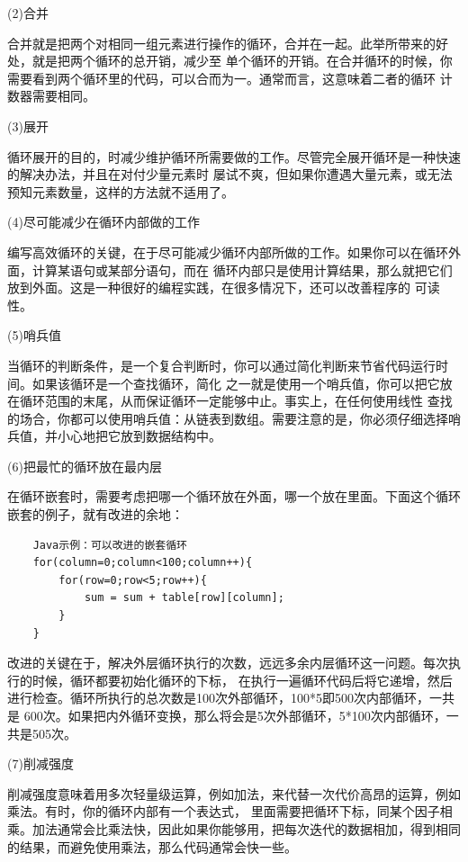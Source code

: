\documentclass{article}
\begin{document}
\par
(2)合并
\par
合并就是把两个对相同一组元素进行操作的循环，合并在一起。此举所带来的好处，就是把两个循环的总开销，减少至
单个循环的开销。在合并循环的时候，你需要看到两个循环里的代码，可以合而为一。通常而言，这意味着二者的循环
计数器需要相同。

\par
(3)展开
\par
循环展开的目的，时减少维护循环所需要做的工作。尽管完全展开循环是一种快速的解决办法，并且在对付少量元素时
屡试不爽，但如果你遭遇大量元素，或无法预知元素数量，这样的方法就不适用了。

\par
(4)尽可能减少在循环内部做的工作
\par
编写高效循环的关键，在于尽可能减少循环内部所做的工作。如果你可以在循环外面，计算某语句或某部分语句，而在
循环内部只是使用计算结果，那么就把它们放到外面。这是一种很好的编程实践，在很多情况下，还可以改善程序的
可读性。

\par
(5)哨兵值
\par
当循环的判断条件，是一个复合判断时，你可以通过简化判断来节省代码运行时间。如果该循环是一个查找循环，简化
之一就是使用一个哨兵值，你可以把它放在循环范围的末尾，从而保证循环一定能够中止。事实上，在任何使用线性
查找的场合，你都可以使用哨兵值：从链表到数组。需要注意的是，你必须仔细选择哨兵值，并小心地把它放到数据结构中。

\par
(6)把最忙的循环放在最内层
\par
在循环嵌套时，需要考虑把哪一个循环放在外面，哪一个放在里面。下面这个循环嵌套的例子，就有改进的余地：
\begin{lstlisting}
    Java示例：可以改进的嵌套循环
    for(column=0;column<100;column++){
        for(row=0;row<5;row++){
            sum = sum + table[row][column];
        }
    }
\end{lstlisting}
改进的关键在于，解决外层循环执行的次数，远远多余内层循环这一问题。每次执行的时候，循环都要初始化循环的下标，
在执行一遍循环代码后将它递增，然后进行检查。循环所执行的总次数是100次外部循环，100*5即500次内部循环，一共是
600次。如果把内外循环变换，那么将会是5次外部循环，5*100次内部循环，一共是505次。

\par
(7)削减强度
\par
削减强度意味着用多次轻量级运算，例如加法，来代替一次代价高昂的运算，例如乘法。有时，你的循环内部有一个表达式，
里面需要把循环下标，同某个因子相乘。加法通常会比乘法快，因此如果你能够用，把每次迭代的数据相加，得到相同
的结果，而避免使用乘法，那么代码通常会快一些。
\end{document}
